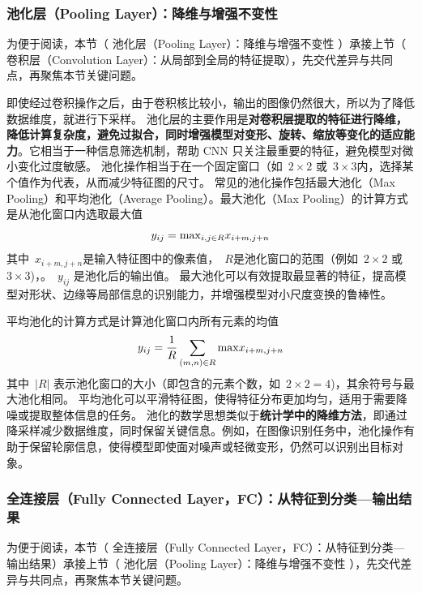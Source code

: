 \subsubsection*{   池化层（Pooling Layer）：降维与增强不变性  }


为便于阅读，本节（   池化层（Pooling Layer）：降维与增强不变性  ）承接上节（  卷积层（Convolution Layer）：从局部到全局的特征提取），先交代差异与共同点，再聚焦本节关键问题。

即使经过卷积操作之后，由于卷积核比较小，输出的图像仍然很大，所以为了降低数据维度，就进行下采样。
池化层的主要作用是{\bf 对卷积层提取的特征进行降维，降低计算复杂度，避免过拟合，同时增强模型对变形、旋转、缩放等变化的适应能力}。它相当于一种信息筛选机制，帮助 CNN 只关注最重要的特征，避免模型对微小变化过度敏感。
池化操作相当于在一个固定窗口（如~$2\times 2$ 或~$ 3\times 3$内，选择某个值作为代表，从而减少特征图的尺寸。
常见的池化操作包括最大池化（Max Pooling）和平均池化（Average Pooling）。最大池化（Max Pooling）的计算方式是从池化窗口内选取最大值
$$
y_{ij}  ={\rm max}_{i,j \in R} x_{i+m, j+n}
$$
其中~$x_{i+m, j+n}$是输入特征图中的像素值，~$R$是池化窗口的范围（例如~$2\times 2$ 或~$ 3\times 3$)，。~$y_{ij}$ 是池化后的输出值。
最大池化可以有效提取最显著的特征，提高模型对形状、边缘等局部信息的识别能力，并增强模型对小尺度变换的鲁棒性。


平均池化的计算方式是计算池化窗口内所有元素的均值
$$
y_{ij}  =\frac{1}{R} \sum_{(m,n)\in R}{\rm max} x_{i+m, j+n}
$$
其中~$|R|$ 表示池化窗口的大小（即包含的元素个数，如~$2\times 2=4$)，其余符号与最大池化相同。
平均池化可以平滑特征图，使得特征分布更加均匀，适用于需要降噪或提取整体信息的任务。
池化的数学思想类似于{\bf 统计学中的降维方法}，即通过降采样减少数据维度，同时保留关键信息。例如，在图像识别任务中，池化操作有助于保留轮廓信息，使得模型即使面对噪声或轻微变形，仍然可以识别出目标对象。

\subsubsection*{   全连接层（Fully Connected Layer，FC）：从特征到分类---输出结果}


为便于阅读，本节（   全连接层（Fully Connected Layer，FC）：从特征到分类---输出结果）承接上节（   池化层（Pooling Layer）：降维与增强不变性  ），先交代差异与共同点，再聚焦本节关键问题。

